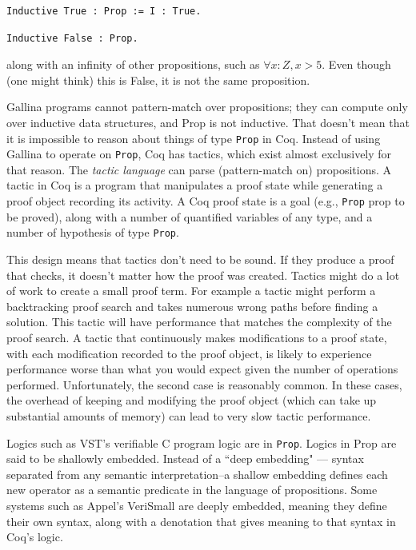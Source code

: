 \documentclass{puthesis}
\begin{document}
\begin{lstlisting}
Inductive True : Prop := I : True.
\end{lstlisting}
\begin{lstlisting}
Inductive False : Prop.
\end{lstlisting}

\noindent along with an infinity of other propositions, such as
$\forall x:Z, x>5$.  Even though (one might think) this is False, it is not
the same proposition.

\noindent 
Gallina programs cannot pattern-match over propositions; they can
compute only over inductive data structures, and Prop is not
inductive. That doesn't mean that it is impossible to reason about
things of type \lstinline|Prop| in Coq. Instead of using Gallina to
operate on \lstinline|Prop|, Coq has tactics, which exist almost
exclusively for that reason. The \emph{tactic language} can parse
(pattern-match on) propositions. A tactic in Coq is a program that
manipulates a proof state while generating a proof object recording
its activity. A Coq proof state is a goal (e.g., \lstinline|Prop| prop
to be proved), along with a number of quantified variables of any
type, and a number of hypothesis of type \lstinline|Prop|. 

This design means that tactics don't need to be sound. If they produce
a proof that checks, it doesn't matter how the proof was
created. Tactics might do a lot of work to create a small proof
term. For example a tactic might perform a backtracking proof search
and takes numerous wrong paths before finding a solution. This tactic
will have performance that matches the complexity of the proof
search. A tactic that continuously makes modifications to a proof
state, with each modification recorded to the proof object, is likely
to experience performance worse than what you would expect given the
number of operations performed. Unfortunately, the second case is
reasonably common. In these cases, the overhead of keeping and
modifying the proof object (which can take up substantial amounts of
memory) can lead to very slow tactic performance.

Logics such as VST's verifiable C program logic are in
\lstinline|Prop|. Logics in Prop are said to be shallowly embedded.
Instead of a ``deep embedding" --- syntax separated from any semantic
interpretation--a shallow embedding defines each new operator as a
semantic predicate in the language of propositions.  Some systems such
as Appel's VeriSmall \cite{appel11:cpp} are deeply embedded, meaning
they define their own syntax, along with a denotation that gives
meaning to that syntax in Coq's logic.
\end{document}
